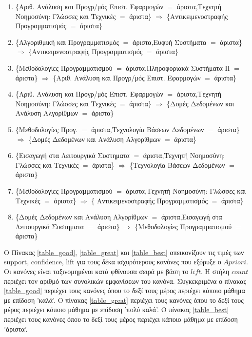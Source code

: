 \documentclass[12pt,a4paper,final]{article}
\begin{document}
\begin{landscape}
\begin{enumerate}
\item \{Αριθ. Ανάλυση και Προγρ/μός Επιστ. Εφαρμογών $=$ άριστα,Τεχνητή Νοημοσύνη: Γλώσσες και Τεχνικές $=$ άριστα\} $\Rightarrow$ \{Αντικειμενοστραφής Προγραμματισμός $=$ άριστα\}


\item \{Αλγοριθμική και Προγραμματισμός $=$ άριστα,Ευφυή Συστήματα $=$ άριστα\} $\Rightarrow$ \{Αντικειμενοστραφής Προγραμματισμός  $=$ άριστα\}


\item \{Μεθοδολογίες Προγραμματισμού $=$ άριστα,Πληροφοριακά Συστήματα ΙΙ $=$ άριστα\} $\Rightarrow$ \{Αριθ. Ανάλυση και Προγρ/μός Επιστ. Εφαρμογών $=$ άριστα\}


\item \{Αριθ. Ανάλυση και Προγρ/μός Επιστ. Εφαρμογών $=$ άριστα,Τεχνητή Νοημοσύνη: Γλώσσες και Τεχνικές $=$ άριστα\} $\Rightarrow$ \{Δομές Δεδομένων και Ανάλυση Αλγορίθμων $=$ άριστα\}


\item \{Μεθοδολογίες Προγ. $=$ άριστα,Τεχνολογία Βάσεων Δεδομένων $=$ άριστα\} $\Rightarrow$ \{Δομές Δεδομένων και Ανάλυση Αλγορίθμων $=$ άριστα\}

 
\item \{Εισαγωγή στα Λειτουργικά Συστηματα $=$ άριστα,Τεχνητή Νοημοσύνη: Γλώσσες και Τεχνικές $=$ άριστα\} $\Rightarrow$ \{Τεχνολογία Βάσεων Δεδομένων $=$ άριστα\}


\item \{Μεθοδολογίες Προγραμματισμού $=$ άριστα,Τεχνητή Νοημοσύνη: Γλώσσες και Τεχνικές $=$ άριστα\} $\Rightarrow$   \{ Αντικειμενοστραφής Προγραμματισμός $=$ άριστα\}


\item \{Δομές Δεδομένων και Ανάλυση Αλγορίθμων $=$ άριστα,Εισαγωγή στα Λειτουργικά Συστηματα $=$ άριστα\} $\Rightarrow$ \{Μεθοδολογίες Προγραμματισμού $=$ άριστα\}



\end{enumerate}

\end{landscape}


\clearpage
Ο Πίνακας \ref{table_good}, \ref{table_great} και \ref{table_best} απεικονίζουν τις τιμές των \foreignlanguage{english}{support, confidence, lift} για τους δέκα ισχυρότερους κανόνες που εξόρυξε ο $Apriori$. Οι κανόνες είναι ταξινομημένοι κατά φθίνουσα σειρά με βάση το $lift$. Η στήλη $count$ περιέχει τον αριθμό των συνολικών εμφανίσεων του κανόνα.
Συγκεκριμένα ο πίνακας \ref{table_good} περιέχει τους κανόνες όπου το δεξί τους μέρος περιέχει κάποιο μάθημα με επίδοση 'καλά'. Ο πίνακας \ref{table_great} περιέχει τους κανόνες όπου το δεξί τους μέρος περιέχει κάποιο μάθημα με επίδοση 'πολύ καλά'. Ο πίνακας \ref{table_best} περιέχει τους κανόνες όπου το δεξί τους μέρος περιέχει κάποιο μάθημα με επίδοση 'άριστα'.
\end{document}
